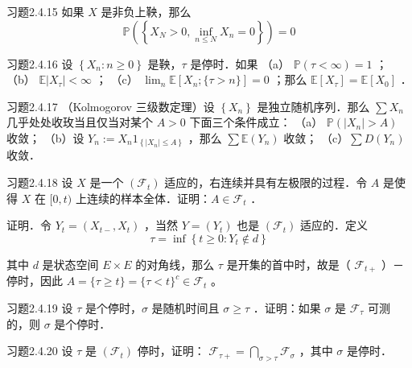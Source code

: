 \begin{namedthm}{习题2.4.15}
    如果 $X$ 是非负上鞅，那么
$$
\mathbb{P}\left(\left\{X_{N}>0, \inf _{n \leq N} X_{n}=0\right\}\right)=0
$$
\end{namedthm}

\begin{namedthm}{习题2.4.16}
    设 $\left\{X_{n}: n \geq 0\right\}$ 是鞅，$\tau$ 是停时．如果
（a） $\mathbb{P}(\tau<\infty)=1$ ；
（b） $\mathbb{E}\left|X_{\tau}\right|<\infty$ ；
（c） $\lim _{n} \mathbb{E}\left[X_{n} ;\{\tau>n\}\right]=0$ ；那么 $\mathbb{E}\left[X_{\tau}\right]=\mathbb{E}\left[X_{0}\right]$ ．
\end{namedthm}

\begin{namedthm}{习题2.4.17}
    （Kolmogorov 三级数定理）设 $\left\{X_{n}\right\}$ 是独立随机序列．那么 $\sum X_{n}$ 几乎处处收玫当且仅当对某个 $A>0$ 下面三个条件成立：
（a） $\mathbb{P}\left(\left|X_{n}\right|>A\right)$ 收敛；
（b）设 $Y_{n}:=X_{n} 1_{\left\{\left|X_{n}\right| \leq A\right\}}$ ，那么 $\sum \mathbb{E}\left(Y_{n}\right)$ 收敛；
（c）$\sum D\left(Y_{n}\right)$ 收敛．
\end{namedthm}

\begin{namedthm}{习题2.4.18}
    设 $X$ 是一个 $\left(\mathscr{F}_{t}\right)$ 适应的，右连续并具有左极限的过程．令 $A$ 是使得 $X$ 在 $[0, t)$ 上连续的样本全体．证明：$A \in \mathscr{F}_{t}$ ．

证明．令 $Y_{t}=\left(X_{t-}, X_{t}\right)$ ，当然 $Y=\left(Y_{t}\right)$ 也是 $\left(\mathscr{F}_{t}\right)$ 适应的．定义
$$
\tau=\inf \left\{t \geq 0: Y_{t} \notin d\right\}
$$

其中 $d$ 是状态空间 $E \times E$ 的对角线，那么 $\tau$ 是开集的首中时，故是（ $\mathscr{F}_{t+}$ ）－停时，因此 $A=\{\tau \geq t\}=\{\tau<t\}^{c} \in \mathscr{F}_{t}$ 。
\end{namedthm}

\begin{namedthm}{习题2.4.19}
    设 $\tau$ 是个停时，$\sigma$ 是随机时间且 $\sigma \geq \tau$ ．证明：如果 $\sigma$ 是 $\mathscr{F}_{\tau}$ 可测的，则 $\sigma$ 是个停时．
\end{namedthm}

\begin{namedthm}{习题2.4.20}
    设 $\tau$ 是 $\left(\mathscr{F}_{t}\right)$ 停时，证明： $\mathscr{F}_{\tau+}=\bigcap_{\sigma>\tau} \mathscr{F}_{\sigma}$ ，其中 $\sigma$ 是停时．
\end{namedthm}

